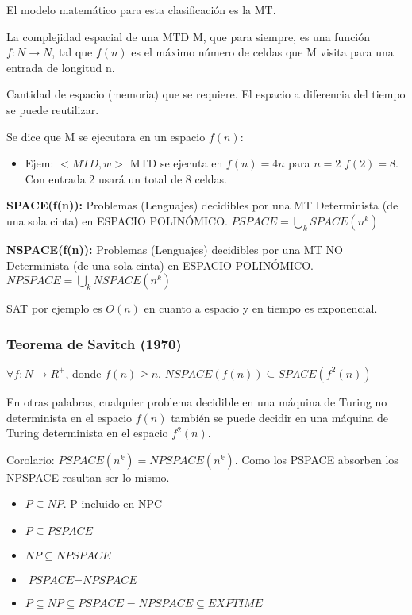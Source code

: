 El modelo matemático para esta clasificación es la MT.

La complejidad espacial de una MTD M, que para siempre, es una función $f: N \rightarrow N$, tal que $f(n)$ es el máximo número de celdas que M visita para una entrada de longitud n.

Cantidad de espacio (memoria) que se requiere. El espacio a diferencia del tiempo se puede reutilizar.

Se dice que M se ejecutara en un espacio $f(n)$:
\begin{itemize}
	\item Ejem: $<MTD, w>$ MTD se ejecuta en $f(n)=4n$ para $n=2$ $f(2)=8$. Con entrada 2 usará un total de 8 celdas.
\end{itemize}

\textbf{SPACE(f(n)):} Problemas (Lenguajes) decidibles por una MT Determinista (de una sola cinta) en ESPACIO POLINÓMICO. $PSPACE=\bigcup_k SPACE(n^k)$

\textbf{NSPACE(f(n)):} Problemas (Lenguajes) decidibles por una MT NO Determinista (de una sola cinta) en ESPACIO POLINÓMICO. $NPSPACE=\bigcup_k NSPACE(n^k)$

SAT por ejemplo es $O(n)$ en cuanto a espacio y en tiempo es exponencial.

\subsubsection{Teorema de Savitch (1970)}
$\forall f: N \rightarrow R^+$, donde $f(n)\geq n$. $\textit{NSPACE}(f(n)) \subseteq \textit{SPACE}(f^2(n))$

En otras palabras, cualquier problema decidible en una máquina de Turing no determinista en el espacio $f(n)$ también se puede decidir en una máquina de Turing determinista en el espacio $f^2(n)$.

Corolario: $\textit{PSPACE}(n^k)=\textit{NPSPACE}(n^k)$. Como los PSPACE absorben los NPSPACE resultan ser lo mismo.
\begin{itemize}
	\item $P \subseteq NP$. P incluido en NPC
	\item $P \subseteq \textit{PSPACE}$
	\item $NP \subseteq \textit{NPSPACE}$
	\item $\textit{PSPACE} = \textit{NPSPACE}$
	\item $P \subseteq NP \subseteq \textit{PSPACE}=\textit{NPSPACE} \subseteq \textit{EXPTIME}$
\end{itemize}